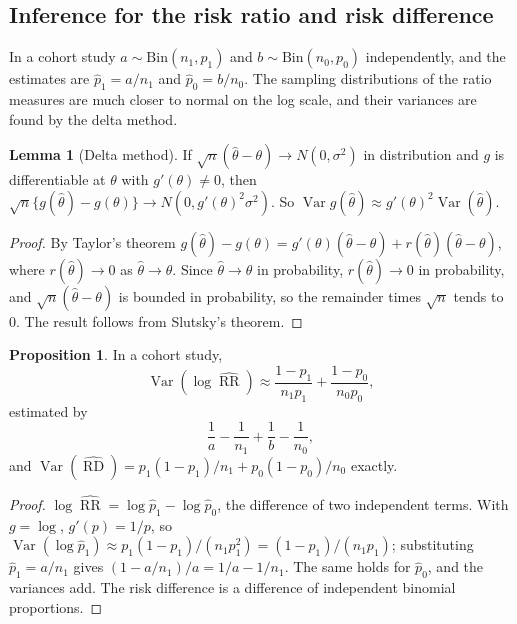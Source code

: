 \documentclass[11pt,a4paper]{article}
\numberwithin{equation}{section}
\DeclareMathOperator{\Var}{Var}
\DeclareMathOperator{\RR}{RR}
\DeclareMathOperator{\RD}{RD}
\theoremstyle{definition}
\newtheorem{prop}[thm]{Proposition}
\newtheorem{lem}[thm]{Lemma}
\begin{document}
\subsection{Inference for the risk ratio and risk difference}
\label{sec:rrci}

In a cohort study $a \sim \text{Bin}(n_1, p_1)$ and $b \sim \text{Bin}(n_0, p_0)$ independently, and the estimates are $\hat p_1 = a/n_1$ and $\hat p_0 = b/n_0$. The
sampling distributions of the ratio measures are much closer to normal on the log scale, and their variances are found by the delta
method.

\begin{lem}[Delta method]
\label{lem:delta}
If $\sqrt n(\hat\theta - \theta) \to N(0, \sigma^2)$ in distribution and $g$ is differentiable at $\theta$ with $g'(\theta) \neq 0$, then
$\sqrt n\{g(\hat\theta) - g(\theta)\} \to N(0, g'(\theta)^2\sigma^2)$. So $\Var g(\hat\theta) \approx g'(\theta)^2 \Var(\hat\theta)$.
\end{lem}

\begin{proof}
By Taylor's theorem $g(\hat\theta) - g(\theta) = g'(\theta)(\hat\theta - \theta) + r(\hat\theta)(\hat\theta - \theta)$, where $r(\hat\theta) \to 0$ as $\hat\theta \to \theta$. Since $\hat\theta \to \theta$ in
probability, $r(\hat\theta) \to 0$ in probability, and $\sqrt n(\hat\theta - \theta)$ is bounded in probability, so the remainder times $\sqrt n$ tends to $0$. The
result follows from Slutsky's theorem.
\end{proof}

\begin{prop}
\label{prop:logrr}
In a cohort study,
\[
\Var(\log \widehat{\RR}) \approx \frac{1 - p_1}{n_1 p_1} + \frac{1 - p_0}{n_0 p_0} ,
\]
estimated by
\[
\frac{1}{a} - \frac{1}{n_1} + \frac{1}{b} - \frac{1}{n_0} ,
\]
and $\Var(\widehat{\RD}) = p_1(1 - p_1)/n_1 + p_0(1 - p_0)/n_0$ exactly.
\end{prop}

\begin{proof}
$\log\widehat{\RR} = \log\hat p_1 - \log\hat p_0$, the difference of two independent terms. With $g = \log$, $g'(p) = 1/p$, so
$\Var(\log\hat p_1) \approx p_1(1 - p_1)/(n_1 p_1^2) = (1 - p_1)/(n_1 p_1)$; substituting $\hat p_1 = a/n_1$ gives $(1 - a/n_1)/a = 1/a - 1/n_1$. The
same holds for $\hat p_0$, and the variances add. The risk difference is a difference of independent binomial proportions.
\end{proof}
\end{document}
